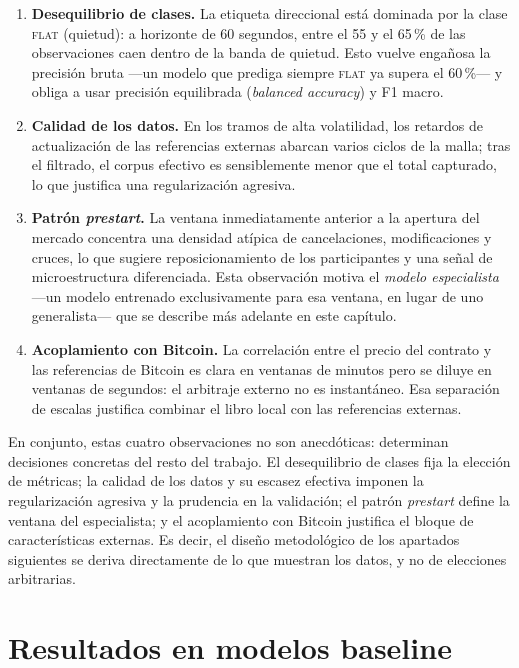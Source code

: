 \begin{enumerate}[noitemsep]
  \item \textbf{Desequilibrio de clases.} La etiqueta direccional está dominada por la
  clase \textsc{flat} (quietud): a horizonte de 60 segundos, entre el 55 y el 65\,\% de las
  observaciones caen dentro de la banda de quietud. Esto vuelve engañosa la precisión bruta
  —un modelo que prediga siempre \textsc{flat} ya supera el 60\,\%— y obliga a usar
  precisión equilibrada (\emph{balanced accuracy}) y F1 macro.
  \item \textbf{Calidad de los datos.} En los tramos de alta volatilidad, los retardos de
  actualización de las referencias externas abarcan varios ciclos de la malla; tras el
  filtrado, el corpus efectivo es sensiblemente menor que el total capturado, lo que justifica
  una regularización agresiva.
  \item \textbf{Patrón \emph{prestart}.} La ventana inmediatamente anterior a la apertura
  del mercado concentra una densidad atípica de cancelaciones, modificaciones y cruces, lo
  que sugiere reposicionamiento de los participantes y una señal de microestructura
  diferenciada. Esta observación motiva el \emph{modelo especialista} ---un modelo entrenado
exclusivamente para esa ventana, en lugar de uno generalista--- que se describe más adelante
en este capítulo.
  \item \textbf{Acoplamiento con Bitcoin.} La correlación entre el precio del contrato y las
  referencias de Bitcoin es clara en ventanas de minutos pero se diluye en ventanas de
  segundos: el arbitraje externo no es instantáneo. Esa separación de escalas justifica
  combinar el libro local con las referencias externas.
\end{enumerate}

En conjunto, estas cuatro observaciones no son anecdóticas: determinan decisiones concretas
del resto del trabajo. El desequilibrio de clases fija la elección de métricas; la calidad de
los datos y su escasez efectiva imponen la regularización agresiva y la prudencia en la
validación; el patrón \emph{prestart} define la ventana del especialista; y el acoplamiento
con Bitcoin justifica el bloque de características externas. Es decir, el diseño metodológico
de los apartados siguientes se deriva directamente de lo que muestran los datos, y no de
elecciones arbitrarias.

\section{Resultados en modelos baseline}

